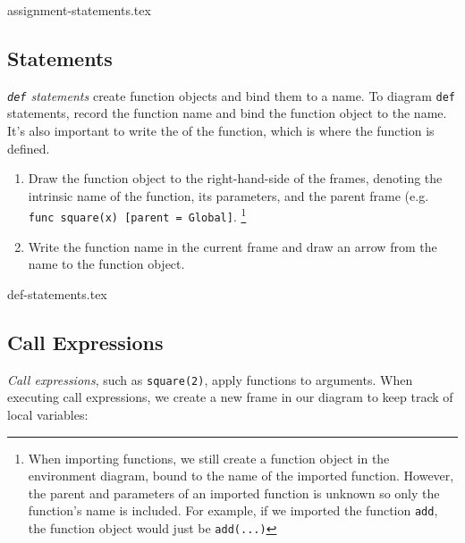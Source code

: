 \begin{questions}
{assignment-statements.tex}

\newpage

\subsection*{ Statements}
\emph{\texttt{def} statements} create function objects and bind them to a name.
To diagram \texttt{def} statements, record the function name and bind the
function object to the name. It's also important to write the  of the function, which is where the function is defined.

\begin{enumerate}
    \item Draw the function object to the right-hand-side of the frames,
    denoting the intrinsic name of the function, its parameters, and the parent
    frame (e.g. \texttt{func square(x) [parent = Global]}.
        \footnote{When importing functions, we still create a function object in the environment
        diagram, bound to the name of the imported function. However, the parent and parameters
        of an imported function is unknown so only the function's name is included.
        For example, if we imported the function \texttt{add}, the function object would just be
        \texttt{add(...)}}
    \item Write the function name in the current frame and draw an arrow from the
    name to the function object. \\
\end{enumerate}

{def-statements.tex}

\newpage

\subsection*{Call Expressions}
\emph{Call expressions}, such as \texttt{square(2)}, apply functions to
arguments. When executing call expressions, we create a new frame in our
diagram to keep track of local variables:


\end{questions}
